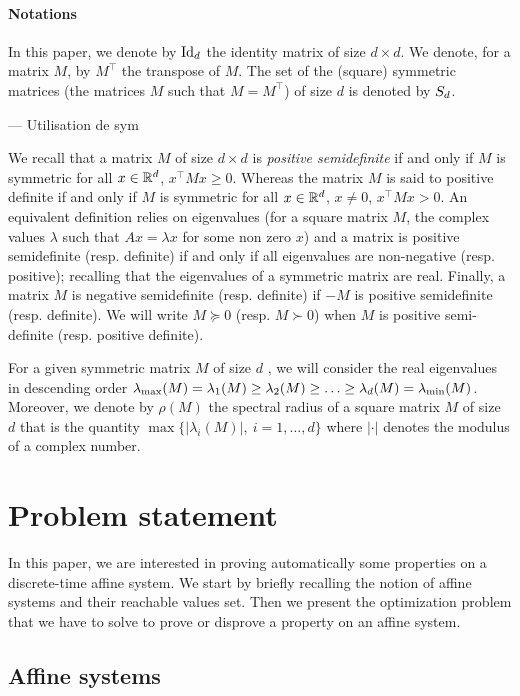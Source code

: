 \documentclass[10pt]{article}
\newcommand\ForAuthors[1]%
 {\par\smallskip                     %
  \begin{center}%
   \fbox%
   {\parbox{0.9\linewidth}%
    {\raggedright\sc--- #1}%
   }%
  \end{center}%
  \par\smallskip                     %
 }
\begin{document}
\paragraph{Notations}
In this paper, we denote by $\operatorname{Id}_d$ the identity matrix of size $d\times d$. We denote, for a matrix $M$, by $M^\intercal$ the transpose of $M$. The set of the (square) symmetric matrices  (the matrices $M$ such that $M=M^\intercal$) of size $d$ is denoted by $S_d$.

\ForAuthors{Utilisation de sym}  

We recall that a matrix $M$ of size $d\times d$ is {\it positive semidefinite} if and only if $M$ is symmetric for all $x\in\mathbb R^d$,
$x^\intercal M x\geq 0$. Whereas the matrix $M$ is said to positive definite if and only if $M$ is symmetric for all $x\in\mathbb R^d$, $x\neq 0$, 
$x^\intercal M x>0$. An equivalent definition relies on eigenvalues (for a square matrix $M$, the complex values $\lambda$ such that $Ax=\lambda x$ for some non zero $x$) and a matrix is positive semidefinite (resp. definite) if and only if all eigenvalues are non-negative (resp. positive); recalling that the eigenvalues of a symmetric matrix are real.
Finally, a matrix $M$ is negative semidefinite (resp. definite) if $-M$ is positive semidefinite (resp. definite).
We will write $M\succeq 0$ (resp. $M\succ 0$)  when $M$ is positive semi-definite (resp. positive definite).

For a given symmetric matrix $M$ of size $d$ , we will consider the real eigenvalues in descending order   $\lambda_{\operatorname{max}}(M)=\lambda_1(M)\geq \lambda_2(M)\geq \ldots\geq \lambda_d(M)=\lambda_{\operatorname{min}}(M)$. Moreover, we denote by $\rho(M)$ the spectral radius of a square matrix $M$ of size $d$ that is the quantity $\max\{|\lambda_i(M)|,\ i=1,\ldots,d\}$ where $|\cdot|$ denotes the modulus of a complex number.

\section{Problem statement}
\label{statement}
In this paper, we are interested in proving automatically some properties on a discrete-time affine system. We start by briefly recalling the notion of affine systems and their reachable values set. Then we present the optimization problem that we have to solve to prove or disprove a property on an affine system.

\subsection{Affine systems}
\end{document}
